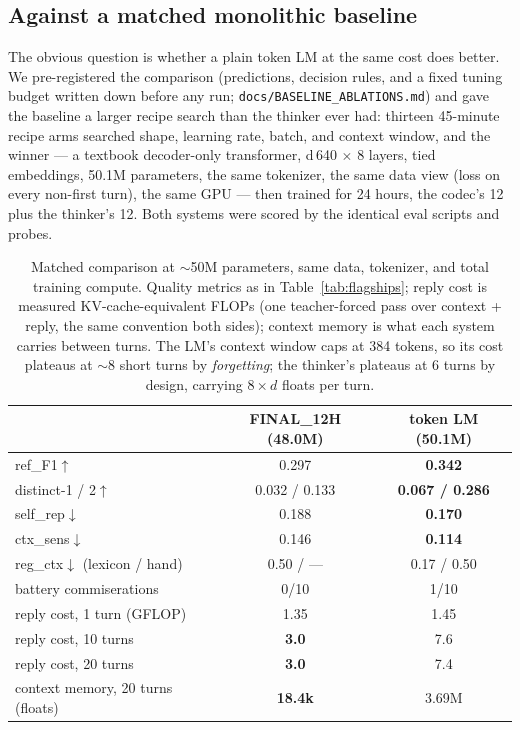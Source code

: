 \documentclass[11pt]{article}
\begin{document}
\subsection{Against a matched monolithic baseline}
\label{sec:baseline}

The obvious question is whether a plain token LM at the same cost does
better. We pre-registered the comparison (predictions, decision rules, and
a fixed tuning budget written down before any run;
\texttt{docs/BASELINE\_ABLATIONS.md}) and gave the baseline a larger
recipe search than the thinker ever had:
thirteen 45-minute recipe arms searched shape, learning rate, batch, and
context window, and the winner --- a textbook decoder-only transformer,
d\,640 $\times$ 8 layers, tied embeddings, 50.1M parameters, the same
tokenizer, the same data view (loss on every non-first turn), the same
GPU --- then trained for 24 hours, the codec's 12 plus the thinker's 12.
Both systems were scored by the identical eval scripts and probes.

\begin{table}[h]
\centering
\small
\begin{tabular}{lcc}
\toprule
 & FINAL\_12H (48.0M) & token LM (50.1M) \\
\midrule
ref\_F1$\uparrow$ & 0.297 & \textbf{0.342} \\
distinct-1 / 2$\uparrow$ & 0.032 / 0.133 & \textbf{0.067 / 0.286} \\
self\_rep$\downarrow$ & 0.188 & \textbf{0.170} \\
ctx\_sens$\downarrow$ & 0.146 & \textbf{0.114} \\
reg\_ctx$\downarrow$ (lexicon / hand) & 0.50 / --- & 0.17 / 0.50 \\
battery commiserations & 0/10 & 1/10 \\
\midrule
reply cost, 1 turn (GFLOP) & 1.35 & 1.45 \\
reply cost, 10 turns & \textbf{3.0} & 7.6 \\
reply cost, 20 turns & \textbf{3.0} & 7.4 \\
context memory, 20 turns (floats) & \textbf{18.4k} & 3.69M \\
\bottomrule
\end{tabular}
\caption{Matched comparison at $\sim$50M parameters, same data, tokenizer,
and total training compute. Quality metrics as in
Table~\ref{tab:flagships}; reply cost is measured KV-cache-equivalent FLOPs
(one teacher-forced pass over context + reply, the same convention both
sides); context memory is what each system carries between turns. The LM's
context window caps at 384 tokens, so its cost plateaus at $\sim$8 short
turns by \emph{forgetting}; the thinker's plateaus at 6 turns by design,
carrying $8 \times d$ floats per turn.}
\label{tab:baseline}
\end{table}
\end{document}
